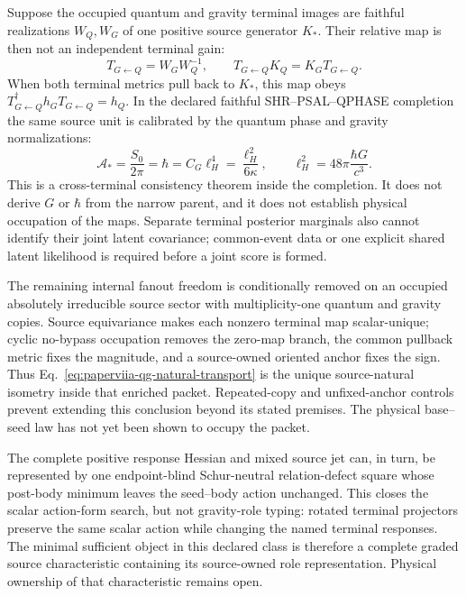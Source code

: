 \documentclass[11pt]{article}
\begin{document}
Suppose the occupied quantum and gravity terminal images are faithful
realizations $W_Q,W_G$ of one positive source generator $K_*$.  Their relative
map is then not an independent terminal gain:
\begin{equation}
 T_{G\leftarrow Q}=W_GW_Q^{-1},\qquad
 T_{G\leftarrow Q}K_Q=K_GT_{G\leftarrow Q}.
 \label{eq:paperviia-qg-natural-transport}
\end{equation}
When both terminal metrics pull back to $K_*$, this map obeys
$T_{G\leftarrow Q}^\dagger h_GT_{G\leftarrow Q}=h_Q$.  In the declared
faithful SHR--PSAL--QPHASE completion the same source unit is calibrated by
the quantum phase and gravity normalizations:
\begin{equation}
 \mathcal A_*=\frac{S_0}{2\pi}=\hbar
 =C_G\ell_H^4=\frac{\ell_H^2}{6\kappa},
 \qquad
 \ell_H^2=48\pi\frac{\hbar G}{c^3}.
 \label{eq:paperviia-common-action-lock}
\end{equation}
This is a cross-terminal consistency theorem inside the completion.  It does
not derive $G$ or $\hbar$ from the narrow parent, and it does not establish
physical occupation of the maps.  Separate terminal posterior marginals also
cannot identify their joint latent covariance; common-event data or one
explicit shared latent likelihood is required before a joint score is formed.

The remaining internal fanout freedom is conditionally removed on an occupied
absolutely irreducible source sector with multiplicity-one quantum and gravity
copies.  Source equivariance makes each nonzero terminal map scalar-unique;
cyclic no-bypass occupation removes the zero-map branch, the common pullback
metric fixes the magnitude, and a source-owned oriented anchor fixes the sign.
Thus Eq.~\eqref{eq:paperviia-qg-natural-transport} is the unique
source-natural isometry inside that enriched packet.  Repeated-copy and
unfixed-anchor controls prevent extending this conclusion beyond its stated
premises.  The physical base--seed law has not yet been shown to occupy the
packet.

The complete positive response Hessian and mixed source jet can, in turn, be
represented by one endpoint-blind Schur-neutral relation-defect square whose
post-body minimum leaves the seed--body action unchanged.  This closes the
scalar action-form search, but not gravity-role typing: rotated terminal
projectors preserve the same scalar action while changing the named terminal
responses.  The minimal sufficient object in this declared class is therefore
a complete graded source characteristic containing its source-owned role
representation.  Physical ownership of that characteristic remains open.
\end{document}
